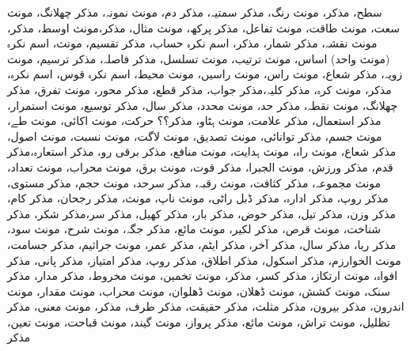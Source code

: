 سطح، مذکر، مونث
رنگ، مذکر
سمتیہ، مذکر
دم، مونث
نمونہ، مذکر
چھلانگ، مونث
سعت، مونث
طاقت، مونث
تفاعل، مذکر
پرکھ، مونث
مثال، مذکر،مونث
اوسط، مذکر، مونث
نقشہ، مذکر
شمار، مذکر، اسم نکرہ
حساب، مذکر
تقسیم، مونث، اسم نکرہ (مونث واحد)
اساس، مونث
ترتیب، مونث
تسلسل، مذکر
فاصلہ، مذکر
ترسیم، مونث
زویہ، مذکر
شعاع، مونث
راس، مونث
راسیں، مونث
محیط، اسم نکرہ
قوس، اسم نکرہ، مذکر، مونث
کرہ، مذکر
کلیہ،مذکر
جواب، مذکر
قطع، مذکر
محور، مونث
تفرق، مذکر
چھلانگ، مونث
نقطہ، مذکر
حد، مونث
محدد، مذکر
سال، مذکر
توسیع، مونث
استمرار، مذکر
استعمال، مذکر
علامت، مونث
ہٹاو، مذکر؟؟
حرکت، مونث
اکائی، مونث
طے، مونث
جسم، مذکر
توانائی، مونث
تصدیق، مونث
لاگت، مونث
نسبت، مونث
اصول، مذکر
شعاع، مونث
راہ، مونث
ہدایت، مونث
منافع، مذکر
برقی رو، مذکر
استعارہ،مذکر
قدم، مذکر
ورزش، مونث
الجبرا، مذکر
قوت، مونث
برق، مونث
محراب، مونث
تعداد، مونث
مجموعہ، مذکر
کثافت، مونث
رقبہ، مذکر
سرحد، مونث
حجم، مذکر
مستوی، مذکر
روپ، مذکر
ادارہ، مذکر
ڈبل راٹی، مونث
ناپ، مونث، مذکر
رجحان، مذکر
کام، مذکر
وزن، مذکر
تیل، مذکر
حوض، مذکر
بار، مذکر
کھیل، مذکر
سر،مذکر
شکر، مذکر
شناخت، مونث
 قرص، مذکر
لکیر، مونث
مائع، مذکر
جگہ، مونث
شرح، مونث
سود، مذکر
ربا، مذکر
سال، مذکر
آخر، مذکر
ایٹم، مذکر
عمر، مونث
جراثیم، مذکر
جسامت، مونث
الخوارزم، مذکر
اسکول، مذکر
اطلاق، مذکر
روپ، مذکر
امتیاز، مذکر
پانی، مذکر
افواہ، مونث
ارتکاز، مذکر
کسر، مذکر، مونث
تخمین، مونث
مخروط، مذکر
مدار، مذکر
سنک، مونث
کشش، مونث
ڈھلان، مونث
ڈھلوان، مونث
محراب، مونث
مقدار، مونث
اندرون، مذکر
بیرون، مذکر
مثلث، مذکر
حقیقت، مذکر
طرف، مذکر، مونث
معنی، مذکر
تظلیل، مونث
تراش، مونث
مائع، مذکر
پرواز، مونث
گیند، مونث
قباحت، مونث
تعین، مذکر

